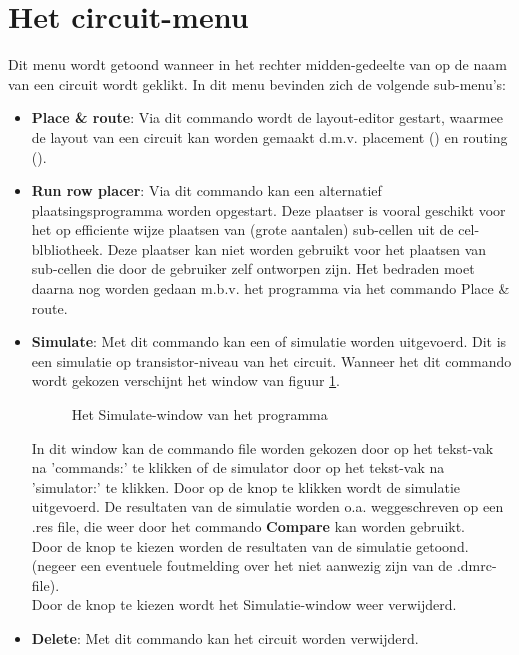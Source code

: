 \section{Het circuit-menu}
Dit menu wordt getoond wanneer in het rechter midden-gedeelte van 
op de naam van een circuit wordt geklikt.
In dit menu bevinden zich de volgende sub-menu's:
\begin{itemize}
\item {\bf Place \& route}:
Via dit commando wordt de layout-editor  gestart, waarmee de layout
van een circuit kan worden gemaakt d.m.v. placement () en routing ().
\item {\bf Run row placer}:
Via dit commando kan een alternatief plaatsingsprogramma worden opgestart.
Deze plaatser is vooral geschikt voor het op efficiente wijze plaatsen van 
(grote aantalen) sub-cellen uit de cel-blbliotheek.
Deze plaatser kan niet worden gebruikt voor het plaatsen van sub-cellen
die door de gebruiker zelf ontworpen zijn.
Het bedraden moet daarna nog worden gedaan m.b.v. het programma 
via het commando Place \& route.
\item {\bf Simulate}:
Met dit commando kan een  of  simulatie worden uitgevoerd.
Dit is een simu\-latie op transistor-niveau van het circuit.
Wanneer het dit commando wordt gekozen verschijnt het window van
figuur \ref{sim-sls-window}.
\begin{figure}[htb]
\centerline{}
\caption{Het Simulate-window van het programma }
\label{sim-sls-window}
\end{figure}
In dit window kan de commando file worden gekozen door op het tekst-vak
na 'commands:' te klikken of de simulator door op het tekst-vak na 'simulator:'
te klikken.
Door op de  knop te klikken wordt de simulatie uitgevoerd.
De resultaten van de simulatie worden o.a. weggeschreven op een .res file,
die weer door het commando {\bf Compare} kan worden gebruikt.\\
Door de knop  te kiezen worden de resultaten van de
simulatie getoond. (negeer een eventuele foutmelding over het niet aanwezig zijn
van de .dmrc-file).\\
Door de  knop te kiezen wordt het Simulatie-window weer verwijderd.
\item {\bf Delete}:
Met dit commando kan het circuit worden verwijderd.
\end{itemize}

